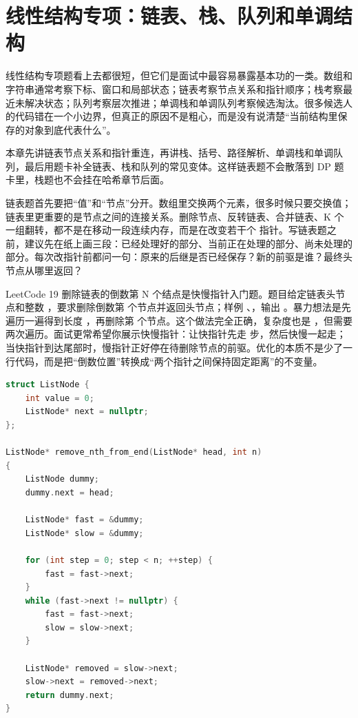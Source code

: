 \chapter{线性结构专项：链表、栈、队列和单调结构}

线性结构专项题看上去都很短，但它们是面试中最容易暴露基本功的一类。数组和字符串通常考察下标、窗口和局部状态；链表考察节点关系和指针顺序；栈考察最近未解决状态；队列考察层次推进；单调栈和单调队列考察候选淘汰。很多候选人的代码错在一个小边界，但真正的原因不是粗心，而是没有说清楚“当前结构里保存的对象到底代表什么”。

本章先讲链表节点关系和指针重连，再讲栈、括号、路径解析、单调栈和单调队列，最后用题卡补全链表、栈和队列的常见变体。这样链表题不会散落到 DP 题卡里，栈题也不会挂在哈希章节后面。

链表题首先要把“值”和“节点”分开。数组里交换两个元素，很多时候只要交换值；链表里更重要的是节点之间的连接关系。删除节点、反转链表、合并链表、K 个一组翻转，都不是在移动一段连续内存，而是在改变若干个  指针。写链表题之前，建议先在纸上画三段：已经处理好的部分、当前正在处理的部分、尚未处理的部分。每次改指针前都问一句：原来的后继是否已经保存？新的前驱是谁？最终头节点从哪里返回？

LeetCode 19 删除链表的倒数第 N 个结点是快慢指针入门题。题目给定链表头节点和整数 ，要求删除倒数第  个节点并返回头节点；样例 、，输出 。暴力想法是先遍历一遍得到长度 ，再删除第  个节点。这个做法完全正确，复杂度也是 ，但需要两次遍历。面试更常希望你展示快慢指针：让快指针先走  步，然后快慢一起走；当快指针到达尾部时，慢指针正好停在待删除节点的前驱。优化的本质不是少了一行代码，而是把“倒数位置”转换成“两个指针之间保持固定距离”的不变量。

\begin{lstlisting}[language=C++,caption={LeetCode 19 删除倒数第 N 个节点：虚拟头节点和快慢指针}]
struct ListNode {
    int value = 0;
    ListNode* next = nullptr;
};

ListNode* remove_nth_from_end(ListNode* head, int n)
{
    ListNode dummy;
    dummy.next = head;

    ListNode* fast = &dummy;
    ListNode* slow = &dummy;

    for (int step = 0; step < n; ++step) {
        fast = fast->next;
    }
    while (fast->next != nullptr) {
        fast = fast->next;
        slow = slow->next;
    }

    ListNode* removed = slow->next;
    slow->next = removed->next;
    return dummy.next;
}
\end{lstlisting}

